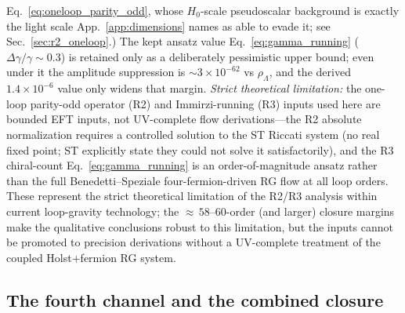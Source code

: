 \documentclass[aps,prd,twocolumn,superscriptaddress,showpacs,preprintnumbers,nofootinbib,longbibliography,floatfix]{revtex4-2}
\begin{document}
Eq.~\eqref{eq:oneloop_parity_odd}, whose $H_0$-scale pseudoscalar
background is exactly the light scale App.~\ref{app:dimensions} names as
able to evade it; see Sec.~\ref{sec:r2_oneloop}.) The kept ansatz value
Eq.~\eqref{eq:gamma_running} ($\Delta\gamma/\gamma\sim0.3$) is retained
only as a deliberately pessimistic upper bound; even under it the
amplitude suppression is $\sim 3\times 10^{-62}$ vs
$\rho_\Lambda$, and the derived $1.4\times10^{-6}$ value only widens
that margin.
\emph{Strict theoretical limitation:} the one-loop parity-odd operator (R2) and
Immirzi-running (R3) inputs used here are bounded EFT inputs, not UV-complete
flow derivations---the R2 absolute normalization requires a controlled solution
to the ST Riccati system (no real fixed point; ST explicitly state they could
not solve it satisfactorily), and the R3 chiral-count
Eq.~\eqref{eq:gamma_running} is an order-of-magnitude ansatz rather than the
full Benedetti--Speziale four-fermion-driven RG flow at all loop orders.
These represent the strict theoretical limitation of the R2/R3 analysis within
current loop-gravity technology; the ${\approx}\,58$--$60$-order (and larger) closure margins make
the qualitative conclusions robust to this limitation, but the inputs cannot be
promoted to precision derivations without a UV-complete treatment of the coupled
Holst$+$fermion RG system.

\subsection{The fourth channel and the combined closure}\label{sec:routes_summary}
\end{document}
